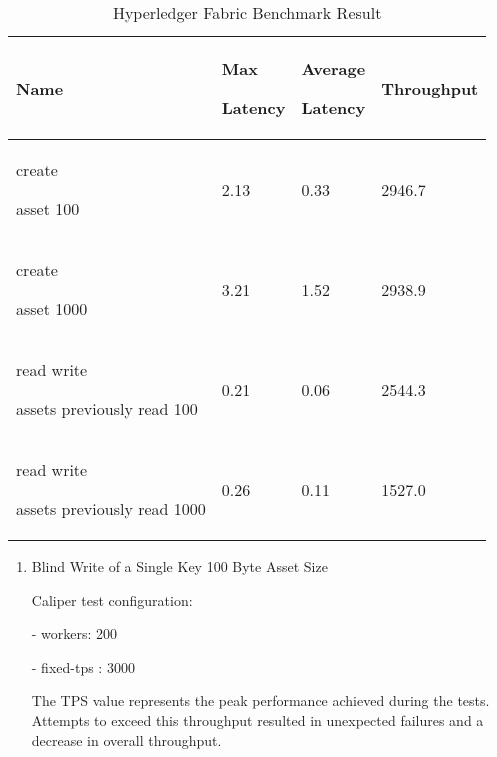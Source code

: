 \documentclass[conference]{IEEEtran}
\begin{document}
\begin{enumerate}[itemsep=2ex, parsep=1ex]
\begin{enumerate}[itemsep=2ex, parsep=1ex]
	      	      \begin{table}[h!]
	      	      	\caption{Hyperledger Fabric Benchmark Result}
	      	      	\def\arraystretch{1.4} \small
	      	      	\begin{tabular}{|p{1.7cm}|p{1.5cm}|p{1.5cm}|p{1.7cm}|}
	      	      		\hline
	      	      		Name                                        & Max \par Latency & Average \par Latency & Throughput \\
	      	      		\hline
	      	      		create \par asset 100                       & 2.13             & 0.33                 & 2946.7     \\
	      	      		\hline
	      	      		create \par asset 1000                      & 3.21             & 1.52                 & 2938.9     \\
	      	      		\hline
	      	      		read write \par assets previously read 100  & 0.21             & 0.06                 & 2544.3     \\
	      	      		\hline
	      	      		read write \par assets previously read 1000 & 0.26             & 0.11                 & 1527.0     \\
	      	      		\hline
	      	      	\end{tabular}
	      	      \end{table}
	      	      	      	      
	      	      \begin{enumerate}[itemsep=2ex, parsep=1ex]
	      	      	\item Blind Write of a Single Key 100 Byte Asset Size
	      	      	      	      	      	      
	      	      	      Caliper test configuration:
	      	      	      	      	      	      
	      	      	      - workers: 200
	      	      	      	      	      	      
	      	      	      - fixed-tps : 3000
	      	      	      	      	      	      
	      	      	      The TPS value represents the peak performance achieved during the tests.
	      	      	      Attempts to exceed this throughput resulted in unexpected failures
	      	      	      and a decrease in overall throughput.
	      	      	      	      	      	      

\end{enumerate}
\end{enumerate}
\end{enumerate}
\end{document}
